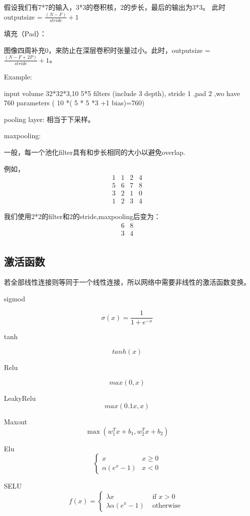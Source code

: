 \documentclass[a4paper]{article}
\begin{document}
假设我们有7*7的输入，3*3的卷积核，2的步长，最后的输出为3*3。
此时outputsize = $\frac{(N-F)}{stride}+1$

填充（Pad）：

图像四周补充0，来防止在深层卷积时张量过小。此时，outputsize = $\frac{(N-F+2P)}{stride}+1$。

Example:

input volume 32*32*3,10 5*5 filters (include 3 depth), stride 1 ,pad 2 ,wo have 760 parameters ( 10 *( 5 * 5 *3 +1 bias)=760)

pooling layer:
相当于下采样。

maxpooling:

一般，每一个池化filter具有和步长相同的大小以避免overlap.

例如，
$$\begin{matrix}  
    1 & 1 & 2 & 4 \\
    5 & 6 & 7 & 8 \\
    3 & 2 & 1 & 0 \\
    1 & 2 & 3 & 4
\end{matrix}$$

我们使用2*2的filter和2的stride,maxpooling后变为：
$$\begin{matrix}  
    6 & 8 \\
    3 & 4  \\
   
\end{matrix}$$



\subsection{激活函数}
若全部线性连接则等同于一个线性连接，所以网络中需要非线性的激活函数变换。

sigmod 

$$
\sigma(x)=\frac{1}{1+e^{-x}}
$$

tanh

$$tanh(x)$$

Relu

$$max(0,x)$$

LeakyRelu
$$max(0.1x,x)$$

Maxout
$$
\max \left(w_{1}^{T} x+b_{1}, w_{2}^{T} x+b_{2}\right)
$$

Elu
$$
\begin{cases}
x & x \geq 0 \\ 
\alpha\left(e^{x}-1\right) & x<0
\end{cases}
$$

SELU
$$
f(x)= \begin{cases}\lambda x & \text { if } x>0 \\ \lambda \alpha\left(e^{x}-1\right) & \text { otherwise }\end{cases}
$$
\end{document}
